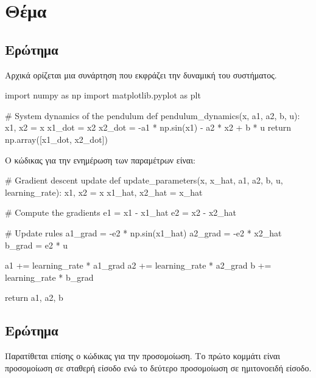 \documentclass{article}
\begin{document}
\clearpage
\section{Θέμα}

\subsection{Ερώτημα}

Αρχικά ορίζεται μια συνάρτηση που εκφράζει την δυναμική του συστήματος.

\begin{python}
import numpy as np
import matplotlib.pyplot as plt

# System dynamics of the pendulum
def pendulum_dynamics(x, a1, a2, b, u):
    x1, x2 = x
    x1_dot = x2
    x2_dot = -a1 * np.sin(x1) - a2 * x2 + b * u
    return np.array([x1_dot, x2_dot])
\end{python}

Ο κώδικας για την ενημέρωση των παραμέτρων είναι:

\begin{python}
# Gradient descent update
def update_parameters(x, x_hat, a1, a2, b, u, learning_rate):
    x1, x2 = x
    x1_hat, x2_hat = x_hat

    # Compute the gradients
    e1 = x1 - x1_hat
    e2 = x2 - x2_hat

    # Update rules
    a1_grad = -e2 * np.sin(x1_hat)
    a2_grad = -e2 * x2_hat
    b_grad = e2 * u

    a1 += learning_rate * a1_grad
    a2 += learning_rate * a2_grad
    b += learning_rate * b_grad

    return a1, a2, b
\end{python}

\subsection{Ερώτημα}

Παρατίθεται επίσης ο κώδικας για την προσομοίωση. Το πρώτο κομμάτι είναι προσομοίωση
σε σταθερή είσοδο ενώ το δεύτερο προσομοίωση σε ημιτονοειδή είσοδο.
\end{document}
